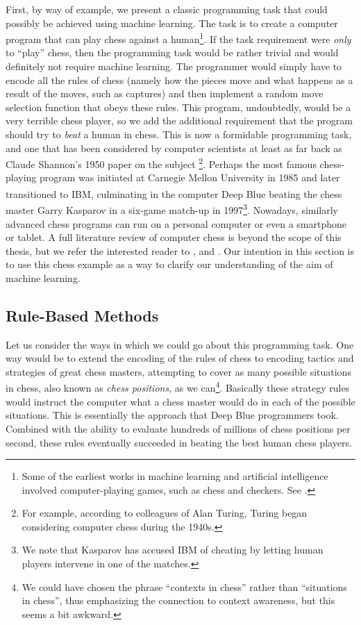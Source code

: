First, by way of example, we present a classic programming task that could possibly be achieved using machine learning. The task is to create a computer program that can play chess against a human\footnote{Some of the earliest works in machine learning and artificial intelligence involved computer-playing games, such as chess and checkers. See \cite{samuel1959some} \cite{shannon1950xxii} \cite{Turing1953}.}. If the task requirement were \emph{only} to ``play'' chess, then the programming task would be rather trivial and would definitely not require machine learning. The programmer would simply have to encode all the rules of chess (namely how the pieces move and what happens as a result of the moves, such as captures) and then implement a random move selection function that obeys these rules. This program, undoubtedly, would be a very terrible chess player, so we add the additional requirement that the program should try to \emph{beat} a human in chess. This is now a formidable programming task, and one that has been considered by computer scientists at least as far back as Claude Shannon's 1950 paper on the subject \cite{shannon1950xxii}\footnote{For example, according to colleagues of Alan Turing, Turing began considering computer chess during the 1940s.}. Perhaps the most famous chess-playing program was initiated at Carnegie Mellon University in 1985 and later transitioned to IBM, culminating in the computer Deep Blue\textsuperscript{\textregistered} beating the chess master Garry Kasparov in a six-game match-up in 1997\footnote{We note that Kasparov has accused IBM of cheating by letting human players intervene in one of the matches.}. Nowadays, similarly advanced chess programs can run on a personal computer or even a smartphone or tablet. A full literature review of computer chess is beyond the scope of this thesis, but we refer the interested reader to \cite{hsu2002behind} \cite{Spicer2006}, and \cite{Russell2010}. Our intention in this section is to use this chess example as a way to clarify our understanding of the aim of machine learning.

\subsection{Rule-Based Methods}
\label{sec:rule-based}

Let us consider the ways in which we could go about this programming task. One way would be to extend the encoding of the rules of chess to encoding tactics and strategies of great chess masters, attempting to cover as many possible situations in chess, also known as \emph{chess positions}, as we can\footnote{We could have chosen the phrase ``contexts in chess'' rather than ``situations in chess'', thus emphasizing the connection to context awareness, but this seems a bit awkward.}. Basically these strategy rules would instruct the computer what a chess master would do in each of the possible situations. This is essentially the approach that Deep Blue programmers took. Combined with the ability to evaluate hundreds of millions of chess positions per second, these rules eventually succeeded in beating the best human chess players.

